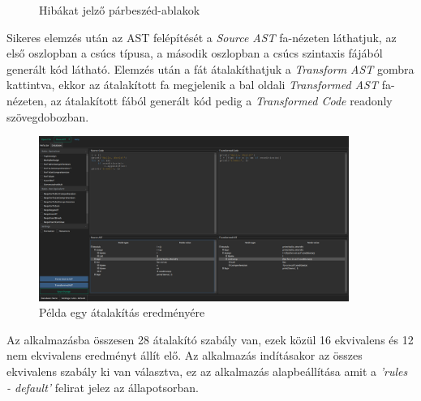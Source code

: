 \begin{figure}[H]
	\centering
	\hspace{5pt}
	\caption{Hibákat jelző párbeszéd-ablakok}
\end{figure}

Sikeres elemzés után az AST felépítését a \emph{Source AST} fa-nézeten láthatjuk, 
az első oszlopban a csúcs típusa, a második oszlopban a csúcs szintaxis fájából generált kód látható. 
Elemzés után a fát átalakíthatjuk a \emph{Transform AST} gombra kattintva, 
ekkor az átalakított fa megjelenik a bal oldali \emph{Transformed AST} fa-nézeten,
az átalakított fából generált kód pedig a \emph{Transformed Code} readonly szövegdobozban.

\begin{figure}[H]
	\centering
	\includegraphics[width=0.9\textwidth]{images/screenshots/refactor_tab_2.png}
	\caption{Példa egy átalakítás eredményére}
\end{figure}

Az alkalmazásba összesen 28 átalakító szabály van, ezek közül 16 ekvivalens és 12 nem ekvivalens
eredményt állít elő.
Az alkalmazás indításakor az összes ekvivalens szabály ki van választva,
ez az alkalmazás alapbeállítása amit a \emph{'rules - default'} felirat jelez az állapotsorban.

